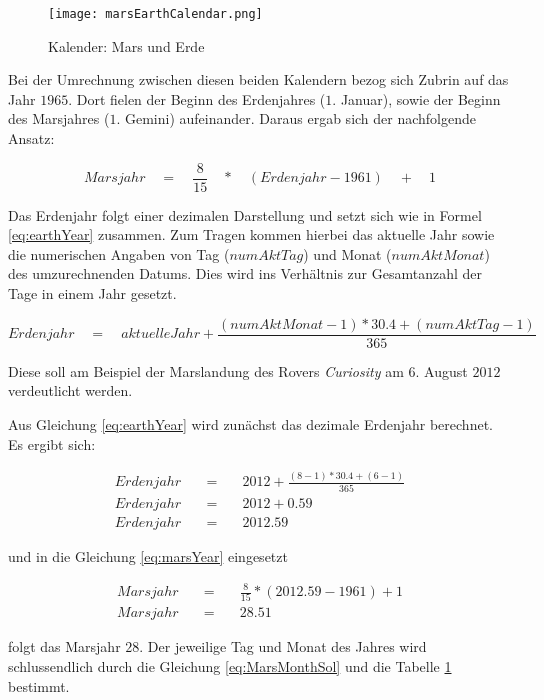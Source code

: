 \begin{figure}[H]
	\centering
	\texttt{[image: marsEarthCalendar.png]}
	\caption[Kalender: Mars und Erde]{Kalender: Mars und Erde \cite{img2}}
	\label{fig:marsEarthCalendar}
\end{figure}

Bei der Umrechnung zwischen diesen beiden Kalendern bezog sich Zubrin auf das
Jahr $1965$. Dort fielen der Beginn des Erdenjahres ($1.$ Januar), sowie der
Beginn des Marsjahres ($1.$ Gemini) aufeinander. Daraus ergab sich der
nachfolgende Ansatz:

\begin{equation}
	Marsjahr \quad = \quad \frac{8}{15} \quad * \quad (Erdenjahr -
	1961) \quad + \quad 1
	\label{eq:marsYear}
\end{equation}

Das Erdenjahr folgt einer dezimalen Darstellung und setzt sich wie in Formel
\ref{eq:earthYear} zusammen. Zum Tragen kommen hierbei das aktuelle Jahr sowie
die numerischen Angaben von Tag ($numAktTag$) und Monat ($numAktMonat$) des
umzurechnenden Datums. Dies wird ins Verh{\"a}ltnis zur Gesamtanzahl der Tage in
einem Jahr gesetzt.

\begin{equation}
	Erdenjahr \quad = \quad aktuelleJahr + \frac{ (numAktMonat - 1) * 30.4 +
	(numAktTag - 1) }{365}
	\label{eq:earthYear}
\end{equation}

Diese soll am Beispiel der Marslandung des Rovers \textit{Curiosity} am
$6.$ August $2012$ verdeutlicht werden.

Aus Gleichung \ref{eq:earthYear} wird zun{\"a}chst das dezimale Erdenjahr
berechnet.
Es ergibt sich:

\begin{eqnarray}
	Erdenjahr \quad & = & \quad 2012 + \frac{ (8-1) * 30.4 + (6-1) }{365} \\
	Erdenjahr \quad & = & \quad 2012 + 0.59 \\
	Erdenjahr \quad & = & \quad 2012.59
\end{eqnarray}

und in die Gleichung \ref{eq:marsYear} eingesetzt

\begin{eqnarray}
	Marsjahr \quad & = & \quad \frac{8}{15} * (2012.59 - 1961) + 1 \\
	Marsjahr \quad & = & \quad 28.51
\end{eqnarray}

folgt das Marsjahr $28$. Der jeweilige Tag und Monat des Jahres wird
schlussendlich durch die Gleichung \ref{eq:MarsMonthSol} und die Tabelle
\ref{fig:marsEarthCalendar} bestimmt.

